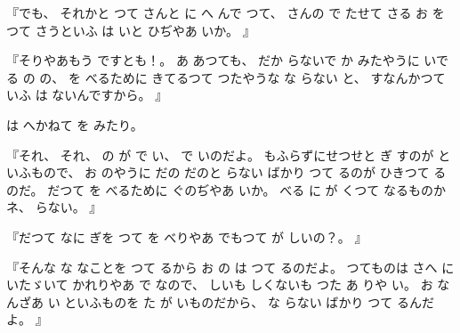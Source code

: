 
『でも、
%
それかと
つて
さんと
に
へ
んで
つて、
%
さんの
で
たせて
さる
お
を
つて
さうといふ
は
いと
ひぢやあ
いか。
』

『そりやあもう
ですとも！。
%
あ
あつても、
%
だか
らないで
か
みたやうに
いでる
の
の、
%
を
べるために
きてるつて
つたやうな
な
らない
と、
%
すなんかつていふ
は
ないんですから。
』

は
へかねて
を
みたり。

『それ、
%
それ、
%
の
が
で
い、
%
で
いのだよ。
%
もふらずにせつせと
ぎ
すのが
といふもので、
%
お
のやうに
だの
だのと
らない
ばかり
つて
るのが
ひきつて
るのだ。
%
だつて
を
べるために
ぐのぢやあ
いか。
%
べる
に
が
くつて
なるものかネ、
%
らない。
』

『だつて
なに
ぎを
つて
を
べりやあ
でもつて
が
しいの？。
』

『そんな
な
なことを
つて
るから
お
の
は
つて
るのだよ。
%
つてものは
さへ
にいたゞいて
かれりやあ
で
なので、
%
しいも
しくないも
つた
あ
りや
い。
%
お
なんざあ
い
といふものを
た
が
いものだから、
%
な
らない
ばかり
つて
るんだよ。
』

